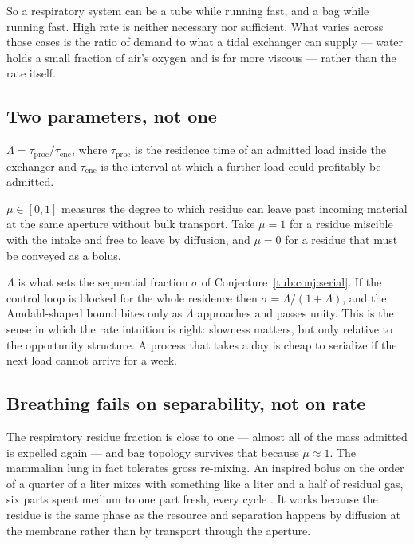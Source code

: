 So a respiratory system can be a tube while running fast, and a bag while
running fast. High rate is neither necessary nor sufficient. What varies across
those cases is the ratio of demand to what a tidal exchanger can supply ---
water holds a small fraction of air's oxygen and is far more viscous --- rather
than the rate itself.

\subsection{Two parameters, not one}

\begin{definition}
\label{tub:def:lambda}
$\Lambda = \tau_{\mathrm{proc}} / \tau_{\mathrm{enc}}$, where
$\tau_{\mathrm{proc}}$ is the residence time of an admitted load inside the
exchanger and $\tau_{\mathrm{enc}}$ is the interval at which a further load
could profitably be admitted.
\end{definition}

\begin{definition}[Separability]
\label{tub:def:mu}
$\mu \in [0,1]$ measures the degree to which residue can leave past incoming
material at the same aperture without bulk transport. Take $\mu = 1$ for a
residue miscible with the intake and free to leave by diffusion, and $\mu = 0$
for a residue that must be conveyed as a bolus.
\end{definition}

$\Lambda$ is what sets the sequential fraction $\sigma$ of
Conjecture~\ref{tub:conj:serial}. If the control loop is blocked for the whole
residence then $\sigma = \Lambda / (1 + \Lambda)$, and the Amdahl-shaped bound
bites only as $\Lambda$ approaches and passes unity. This is the sense in which
the rate intuition is right: slowness matters, but only relative to the
opportunity structure. A process that takes a day is cheap to serialize if the
next load cannot arrive for a week.

\subsection{Breathing fails on separability, not on rate}

The respiratory residue fraction is close to one --- almost all of the mass
admitted is expelled again --- and bag topology survives that because
$\mu \approx 1$. The mammalian lung in fact tolerates gross re-mixing. An
inspired bolus on the order of a quarter of a liter mixes with something like a
liter and a half of residual gas, six parts spent medium to one part fresh,
every cycle \cite{farmer2015}. It works because the residue is the same phase as
the resource and separation happens by diffusion at the membrane rather than by
transport through the aperture.


